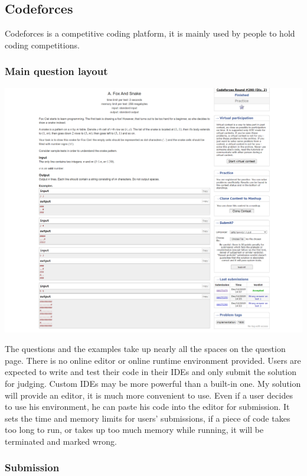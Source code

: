 \documentclass[a4paper]{report}
\begin{document}
\subsection{Codeforces}

Codeforces is a competitive coding platform, it is mainly used by people to hold coding competitions.

\subsubsection{Main question layout}

\includegraphics[width=\linewidth]{Problem-A-Codeforces}

The questions and the examples take up nearly all the spaces on the question page. There is no online editor or online runtime environment provided. Users are expected to write and test their code in their IDEs and only submit the solution for judging. Custom IDEs may be more powerful than a built-in one. My solution will provide an editor, it is much more convenient to use. Even if a user decides to use his environment, he can paste his code into the editor for submission. It sets the time and memory limits for users' submissions, if a piece of code takes too long to run, or takes up too much memory while running, it will be terminated and marked wrong.

\subsubsection{Submission}
\end{document}
